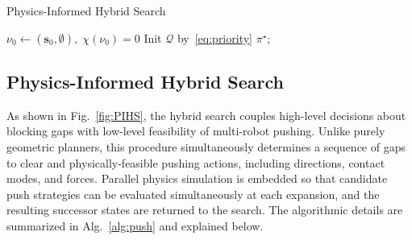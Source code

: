 \begin{algorithm}[t!]
\caption{Physics-Informed Hybrid Search}\label{alg:push}
\SetAlgoLined
{}

\KwOut{$\pi^\star$}
$\nu_0\gets(\mathbf{s}_0,\emptyset),\;\chi(\nu_0)=0$\;
Init $\mathcal{Q}$ by~\eqref{eq:priority}\;
\Return $\pi^\star$;
\end{algorithm}



\subsection{Physics-Informed Hybrid Search}\label{subsec:simloop}

As shown in Fig.~\ref{fig:PIHS},
the hybrid search couples high-level decisions about blocking gaps with
low-level feasibility of multi-robot pushing. Unlike purely geometric
planners, this procedure simultaneously determines a sequence of gaps to clear
and physically-feasible pushing actions, including directions, contact modes,
and forces. Parallel physics simulation is embedded so that candidate
push strategies can be evaluated simultaneously at each expansion, and the resulting
successor states are returned to the search.
The algorithmic details are summarized in Alg.~\ref{alg:push}
and explained below.

